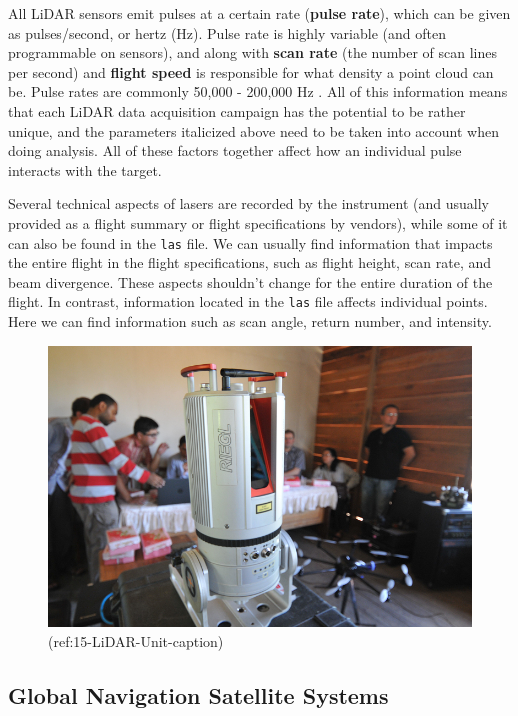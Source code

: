 \documentclass[
]{book}
\begin{document}
All LiDAR sensors emit pulses at a certain rate (\textbf{pulse rate}), which can be given as pulses/second, or hertz (Hz). Pulse rate is highly variable (and often programmable on sensors), and along with \textbf{scan rate} (the number of scan lines per second) and \textbf{flight speed} is responsible for what density a point cloud can be. Pulse rates are commonly 50,000 - 200,000 Hz \citep{white_best_2013}. All of this information means that each LiDAR data acquisition campaign has the potential to be rather unique, and the parameters italicized above need to be taken into account when doing analysis. All of these factors together affect how an individual pulse interacts with the target.

Several technical aspects of lasers are recorded by the instrument (and usually provided as a flight summary or flight specifications by vendors), while some of it can also be found in the \texttt{las} file. We can usually find information that impacts the entire flight in the flight specifications, such as flight height, scan rate, and beam divergence. These aspects shouldn't change for the entire duration of the flight. In contrast, information located in the \texttt{las} file affects individual points. Here we can find information such as scan angle, return number, and intensity.



\begin{figure}
\includegraphics[width=0.75\linewidth]{images/15-LiDAR-Unit} \caption{(ref:15-LiDAR-Unit-caption)}\label{fig:15-LiDAR-Unit}
\end{figure}

\subsection{Global Navigation Satellite Systems}\label{global-navigation-satellite-systems-1}
\end{document}
